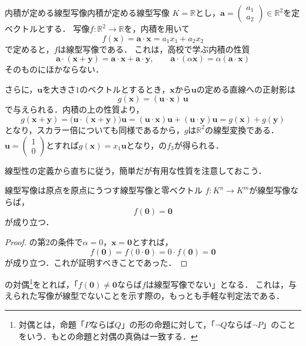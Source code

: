 \begin{example}{内積が定める線型写像}{内積が定める線型写像}
  $K = \mathbb{R}$とし，$\bm{a} = \begin{pmatrix} a_1 \\ a_2 \end{pmatrix} \in \mathbb{R}^2$を定ベクトルとする．
  写像$f \colon \mathbb{R}^2 \to \mathbb{R}$を，内積を用いて
  \[
    f(\bm{x}) = \bm{a} \cdot \bm{x} = a_1 x_1 + a_2 x_2
  \]
  で定めると，$f$は線型写像である．
  これは，高校で学ぶ内積の性質
  \[
    \bm{a} \cdot (\bm{x} + \bm{y}) = \bm{a} \cdot \bm{x} + \bm{a} \cdot \bm{y}, \qquad
    \bm{a} \cdot (\alpha\bm{x}) = \alpha (\bm{a} \cdot \bm{x})
  \]
  そのものにほかならない．

  さらに，$\bm{u}$を大きさ$1$のベクトルとするとき，$\bm{x}$から$\bm{u}$の定める直線への正射影は
  \[
    g(\bm{x}) = (\bm{u} \cdot \bm{x})\,\bm{u}
  \]
  で与えられる．内積の上の性質より，
  \[
    g(\bm{x} + \bm{y}) = \bigl(\bm{u} \cdot (\bm{x} + \bm{y})\bigr)\bm{u}
    = (\bm{u} \cdot \bm{x})\bm{u} + (\bm{u} \cdot \bm{y})\bm{u} = g(\bm{x}) + g(\bm{y})
  \]
  となり，スカラー倍についても同様であるから，$g$は$\mathbb{R}^2$の線型変換である．
  $\bm{u} = \begin{pmatrix} 1 \\ 0 \end{pmatrix}$とすれば$g(\bm{x}) = x_1 \bm{u}$となり，の$f_3$が得られる．
\end{example}

線型性の定義から直ちに従う，簡単だが有用な性質を注意しておこう．

\begin{prop}{線型写像は原点を原点にうつす}{線型写像と零ベクトル}
  $f \colon K^n \to K^m$が線型写像ならば，
  \[
    f(\bm{0}) = \bm{0}
  \]
  が成り立つ．
\end{prop}

\begin{tleftbar}
\begin{proof}
  の第$2$の条件で$\alpha = 0$，$\bm{x} = \bm{0}$とすれば，
  \[
    f(\bm{0}) = f(0 \cdot \bm{0}) = 0 \cdot f(\bm{0}) = \bm{0}
  \]
  が成り立つ．これが証明すべきことであった．
\end{proof}
\end{tleftbar}

の対偶\footnote{対偶とは，命題「$P$ならば$Q$」の形の命題に対して，「$\neg Q$ならば$\neg P$」のことをいう．もとの命題と対偶の真偽は一致する．}をとれば，「$f(\bm{0}) \ne \bm{0}$ならば$f$は線型写像でない」となる．
これは，与えられた写像が線型でないことを示す際の，もっとも手軽な判定法である．

